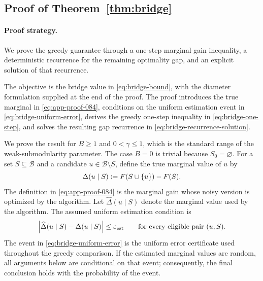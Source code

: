 \documentclass[11pt]{article}
\numberwithin{equation}{section}
\newcommand{\1}{\mathbf 1}
\newcommand{\cB}{\mathcal B}
\newcommand{\abs}[1]{\left\lvert #1\right\rvert}
\newcommand{\defeq}{\vcentcolon=}
\newcommand{\eps}{\varepsilon}
\begin{document}
\subsection{Proof of Theorem~\ref{thm:bridge}}
\label{app:proof-thm-bridge}

\paragraph{Proof strategy.} We prove the greedy guarantee through a one-step marginal-gain inequality, a deterministic recurrence for the remaining optimality gap, and an explicit solution of that recurrence.

The objective is the bridge value in \eqref{eq:bridge-bound}, with the
diameter formulation supplied at the end of the proof.  The proof introduces
the true marginal in \eqref{eq:app-proof-084}, conditions on the uniform
estimation event in \eqref{eq:bridge-uniform-error}, derives the greedy
one-step inequality in \eqref{eq:bridge-one-step}, and solves the resulting
gap recurrence in \eqref{eq:bridge-recurrence-solution}.

We prove the result for \(B\ge 1\) and \(0<\gamma\le 1\), which is the
standard range of the weak-submodularity parameter.  The case \(B=0\) is
trivial because \(S_0=\varnothing\).  For a set \(S\subseteq\cB\) and a
candidate \(u\in\cB\setminus S\), define the true marginal value of \(u\) by
\begin{equation}
\label{eq:app-proof-084}
\Delta(u\mid S)
  \defeq
  F(S\cup\{u\})-F(S).
\end{equation}
The definition in \eqref{eq:app-proof-084} is the marginal gain whose noisy
version is optimized by the algorithm.
Let \(\widehat\Delta(u\mid S)\) denote the marginal value used by the
algorithm.  The assumed uniform estimation condition is
\begin{equation}
  \abs{\widehat\Delta(u\mid S)-\Delta(u\mid S)}
  \le \eps_{\rm est}
  \qquad
  \text{for every eligible pair }(u,S).
\label{eq:bridge-uniform-error}
\end{equation}
The event in \eqref{eq:bridge-uniform-error} is the uniform error certificate
used throughout the greedy comparison.  If the estimated marginal values are
random, all arguments below are conditional on that event; consequently, the
final conclusion holds with the probability of the event.
\end{document}
